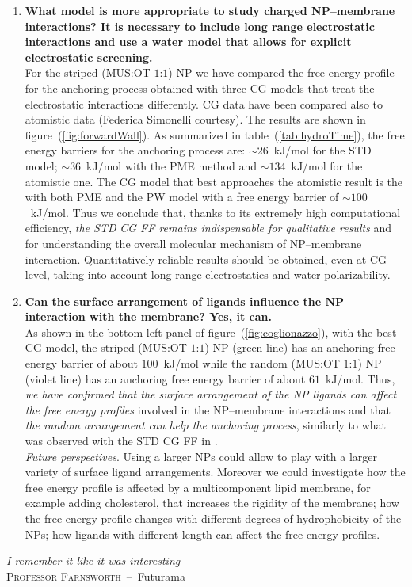 \begin{enumerate}[label=\itshape\roman*.,listparindent=1em]
 	\item \textbf{\textsf{What model is more appropriate to study charged \ac{NP}--membrane interactions? It is necessary to include long range electrostatic interactions and use a water model that allows for explicit electrostatic screening.}}\\For the striped (\acs{MUS}:\acs{OT} $1$:$1$) \ac{NP} we have compared the free energy profile for the anchoring process obtained with three \ac{CG} models that treat the electrostatic interactions differently. \ac{CG} data have been compared also to atomistic data (Federica Simonelli courtesy). The results are shown in figure~(\ref{fig:forwardWall}). As summarized in table~(\ref{tab:hydroTime}), the free energy barriers for the anchoring process are: $\sim26$~kJ/mol for the \ac{STD} \martini model; $\sim36$~kJ/mol with the \ac{PME} method and $\sim134$~kJ/mol for the atomistic one. The \ac{CG} model that best approaches the atomistic result is the \martini with both \ac{PME} and the \ac{PW} model with a free energy barrier of $\sim100$~kJ/mol. Thus we conclude that, thanks to its extremely high computational efficiency, \textit{the \ac{STD}} \martini \textit{\ac{CG} \ac{FF} remains indispensable for qualitative results} and for understanding the overall molecular mechanism of \ac{NP}--membrane interaction. Quantitatively reliable results should be obtained, even at \ac{CG} level, taking into account long range electrostatics and water polarizability.%

	\item \textbf{\textsf{Can the surface arrangement of ligands influence the \ac{NP} interaction with the membrane? Yes, it can.}}\\As shown in the bottom left panel of figure~(\ref{fig:coglionazzo}), with the best \ac{CG} model, the striped (\acs{MUS}:\acs{OT} $1$:$1$) \ac{NP} (green line) has an anchoring free energy barrier of about $100$~kJ/mol while the random (\acs{MUS}:\acs{OT} $1$:$1$) \ac{NP} (violet line) has an anchoring free energy barrier of about $61$~kJ/mol. Thus, \textit{we have confirmed that the surface arrangement of the \ac{NP} ligands can affect the free energy profiles} involved in the \ac{NP}--membrane interactions and that \textit{the random arrangement can help the anchoring process}, similarly to what was observed with the \ac{STD} \martini \ac{CG} \ac{FF} in \cite{ourPaper}.\\\indent\textit{Future perspectives}. Using a larger \acp{NP} could allow to play with a larger variety of surface ligand arrangements. Moreover we could investigate how the free energy profile is affected by a multicomponent lipid membrane, for example adding cholesterol, that increases the rigidity of the membrane; how the free energy profile changes with different degrees of hydrophobicity of the \acp{NP}; how ligands with different length can affect the free energy profiles.%
\end{enumerate}

\vfill
\begin{flushright}
	\textsl{I remember it like it was interesting}\\\smallskip
	\footnotesize\textsc{\sffamily Professor Farnsworth}\ --\ \textsf{Futurama}
\end{flushright}
